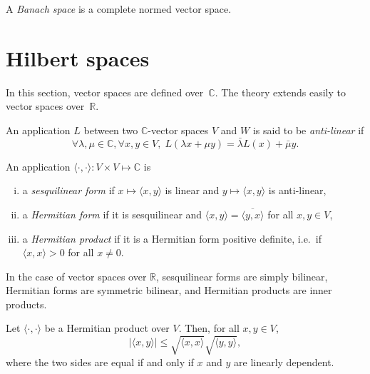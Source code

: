\documentclass[a4paper,11pt,openany,extrafontsizes]{memoir}
\begin{document}


\begin{defn}
  A \emph{Banach space} is a complete normed vector space.
\end{defn}

\section{Hilbert spaces}%
\label{sec:hilbert-spaces}

In this section, vector spaces are defined over~$\mathbb{C}$. The
theory extends easily to vector spaces over~$\mathbb{R}$.

An application $L$ between two $\mathbb{C}$-vector spaces $V$ and $W$
is said to be \emph{anti-linear} if
\[ \forall \lambda,\mu\in\mathbb{C}, \forall x,y\in V,\; L(\lambda x +
  \mu y) = \bar{\lambda} L(x) + \bar{\mu} y. \]

\begin{defn}
  An application $\langle\cdot,\cdot\rangle : V \times V \mapsto \mathbb{C}$ is
  \begin{enumerate}[(i)]
  \item a \emph{sesquilinear form} if $x\mapsto\langle x,y \rangle$ is
    linear and $y\mapsto\langle x,y \rangle$ is anti-linear,
  \item a \emph{Hermitian form} if it is sesquilinear and
    $\langle x,y \rangle = \overline{\langle y,x \rangle}$ for all
    $x,y\in V$,
  \item a \emph{Hermitian product} if it is a Hermitian form positive
    definite, i.e.\ if $\langle x,x \rangle > 0$ for all $x \neq 0$.
  \end{enumerate}
\end{defn}

\begin{rem}
  In the case of vector spaces over $\mathbb{R}$, sesquilinear forms
  are simply bilinear, Hermitian forms are symmetric bilinear, and
  Hermitian products are inner products.
\end{rem}

\begin{prop}
  Let $\langle\cdot,\cdot\rangle$ be a Hermitian product over
  $V$. Then, for all $x,y\in V$,
  \[ \lvert\langle x,y \rangle\rvert \leq \sqrt{\langle x,x \rangle}
    \sqrt{\langle y,y \rangle}, \] where the two sides are equal if
  and only if $x$ and $y$ are linearly dependent.
\end{prop}
\end{document}
